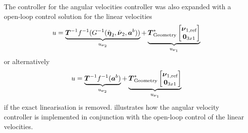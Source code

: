 The \abbrPI controller for the angular velocities controller was also expanded with a open-loop control solution for the linear velocities
\begin{equation}
	u = \underbrace{\boldsymbol{T}^{-1}f^{-1}(G^{-1}(\hat{\etaVector}_2,\hat{\nuVector}_2,\accVector^b))}_{u_{\nuVectorAng}} + \underbrace{\thrusterGeometryOnes[*] \begin{bmatrix}\nuVector_{1,\text{ref}} \\ \zeroCol{3} \end{bmatrix}}_{u_{\nuVectorLin}}	
\end{equation}
or alternatively 
\begin{equation}
	u = \underbrace{\boldsymbol{T}^{-1}f^{-1}(\accVector^b)}_{u_{\nuVectorAng}} + \underbrace{\thrusterGeometryOnes[*] \begin{bmatrix} \nuVector_{1,\text{ref}} \\ \zeroCol{3} \end{bmatrix}}_{u_{\nuVectorLin}}
\end{equation}
if the exact linearisation is removed.  illustrates how the angular velocity controller is implemented in conjunction with the open-loop control of the linear velocities.
